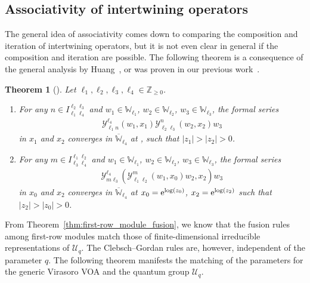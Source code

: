 \documentclass[10pt,a4paper]{amsart}
\numberwithin{equation}{section}
\newtheorem{thm}{Theorem}[section]
\newcommand{\ol}[1]{\overline{#1}}
\newcommand{\bZ}{\mathbb{Z}}
\newcommand{\cU}{\mathcal{U}}
\newcommand{\UEA}{\cU}
\newcommand{\Uq}{\UEA_{q}}
\newcommand{\Chan}[4]{I^{#1 #2}_{#3 #4}}
\newcommand{\voaint}{\mathcal{Y}}
\newcommand{\vmodvec}{w}
\newcommand{\virmod}{\mathbb{W}}
\begin{document}
\subsection{Associativity of intertwining operators}
The general idea of associativity comes down to comparing the composition and iteration of intertwining operators,
but it is not even clear in general if the composition and iteration are possible.
The following theorem is a consequence of the general analysis by Huang~\cite{Huang2005},
or was proven in our previous work~\cite{KoshidaKytola2022}.

\begin{thm}[\cite{Huang2005,KoshidaKytola2022}]
Let $\ell_{1},\ell_{2},\ell_{3},\ell_{4}\in\bZ_{\geq 0}$.
\begin{enumerate}\itemsep=0pt
 \item[$(1)$] For any $n\in \Chan{\ell_{2}}{\ell_{3}}{\ell_{1}}{\ell_{4}}$ and $\vmodvec_{1}\in \virmod_{\ell_{1}}$, $\vmodvec_{2}\in\virmod_{\ell_{2}}$, $\vmodvec_{3}\in\virmod_{\ell_{3}}$, the formal series
 \begin{gather*}
 \voaint_{\ell_{1} n}^{\ell_{4}}(\vmodvec_{1},x_{1})\voaint_{\ell_{2} \ell_{3}}^{n}(\vmodvec_{2},x_{2})\vmodvec_{3}
 \end{gather*}
 in $x_{1}$ and $x_{2}$ converges in $\ol{\virmod}_{\ell_{4}}$ at ,  such that $|z_{1}|>|z_{2}|>0$.
 \item[$(2$] For any $m\in \Chan{\ell_{1}}{\ell_{2}}{\ell_{3}}{\ell_{4}}$ and $\vmodvec_{1}\in \virmod_{\ell_{1}}$, $\vmodvec_{2}\in\virmod_{\ell_{2}}$, $\vmodvec_{3}\in\virmod_{\ell_{3}}$, the formal series
 \begin{gather*}
 \voaint_{m \ell_{3}}^{\ell_{4}}\left(\voaint_{\ell_{1} \ell_{2}}^{m}(\vmodvec_{1},x_{0})\vmodvec_{2},x_{2}\right)\vmodvec_{3}
 \end{gather*}
 in $x_{0}$ and $x_{2}$ converges in $\ol{\virmod}_{\ell_{4}}$ at $x_{0}={\rm e}^{\log (z_{0})}$, $x_{2}={\rm e}^{\log (z_{2})}$ such that $|z_{2}|>|z_{0}|>0$.
\end{enumerate}
\end{thm}

From Theorem~\ref{thm:first-row_module_fusion}, we know that the fusion rules among first-row modules match those of finite-dimensional irreducible representations of $\Uq$.
The Clebsch--Gordan rules are, however, independent of the parameter $q$.
The following theorem manifests the matching of the parameters for the generic Virasoro VOA and the quantum group $\Uq$.
\end{document}
